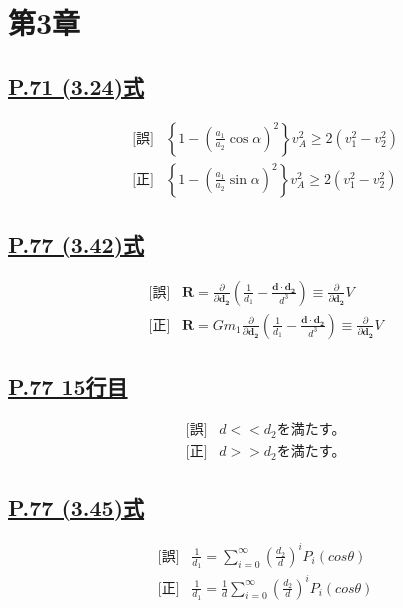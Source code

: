 \documentclass[9pt,fleqn]{bxjsarticle}
\begin{document}
\section*{第3章}

\subsection*{\underline{P.71 (3.24)式}}
\begin{align*}
    &\text{[誤]} \hspace{10pt} \left\lbrace1-\left(\frac{a_1}{a_2}\cos{\alpha}\right)^2\right\rbrace v_A^2 \geq 2(v_1^2-v_2^2) \\
    &\text{[正]} \hspace{10pt} \left\lbrace1-\left(\frac{a_1}{a_2}\sin{\alpha}\right)^2\right\rbrace v_A^2 \geq 2(v_1^2-v_2^2)  
\end{align*}

\subsection*{\underline{P.77 (3.42)式}}
\begin{align*}
    &\text{[誤]} \hspace{10pt} \bm{R} = \frac{\partial}{\partial{\bm{d_2}}}\left(\frac{1}{d_1}-\frac{\bm{d}\cdot\bm{d_2}}{d^3}\right) \equiv \frac{\partial}{\partial{\bm{d_2}}}V \\
    &\text{[正]} \hspace{10pt} \bm{R} = Gm_1\frac{\partial}{\partial{\bm{d_2}}}\left(\frac{1}{d_1}-\frac{\bm{d}\cdot\bm{d_2}}{d^3}\right) \equiv \frac{\partial}{\partial{\bm{d_2}}}V
\end{align*}

\subsection*{\underline{P.77 15行目}}
\begin{align*}
    &\text{[誤]} \hspace{10pt} d<<d_2 \text{を満たす。} \\
    &\text{[正]} \hspace{10pt} d>>d_2 \text{を満たす。}
\end{align*}

\subsection*{\underline{P.77 (3.45)式}}
\begin{align*}
    &\text{[誤]} \hspace{10pt} \frac{1}{d_1} = \sum_{i=0}^{\infty}\left( \frac{d_2}{d}\right)^iP_i(cos{\theta}) \\
    &\text{[正]} \hspace{10pt} \frac{1}{d_1} = \frac{1}{d}\sum_{i=0}^{\infty}\left( \frac{d_2}{d}\right)^iP_i(cos{\theta})
\end{align*}
\end{document}
